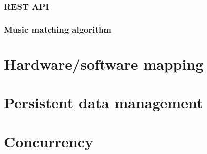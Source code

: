 \subsubsection{REST API}
\subsubsection{Music matching algorithm}

\section{Hardware/software mapping}
\section{Persistent data management}
\section{Concurrency}


